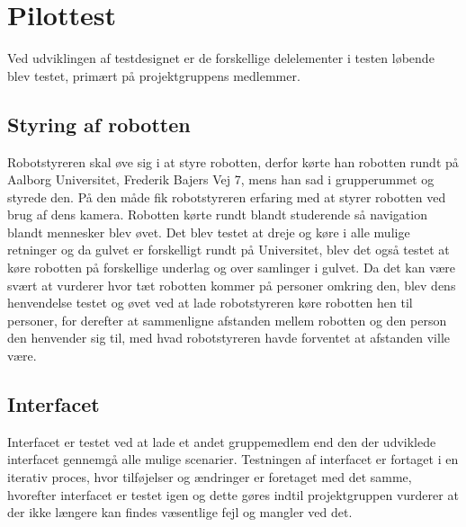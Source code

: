 \section{Pilottest}
\label{ParametrePilottest}
%
Ved udviklingen af testdesignet er de forskellige delelementer i testen løbende blev testet, primært på projektgruppens medlemmer. \blankline
%
\subsection*{Styring af robotten}
Robotstyreren skal øve sig i at styre robotten, derfor kørte han robotten rundt på Aalborg Universitet, Frederik Bajers Vej 7, mens han sad i grupperummet og styrede den. På den måde fik robotstyreren erfaring med at styrer robotten ved brug af dens kamera. Robotten kørte rundt blandt studerende så navigation blandt mennesker blev øvet. Det blev testet at dreje og køre i alle mulige retninger og da gulvet er forskelligt rundt på Universitet, blev det også testet at køre robotten på forskellige underlag og over samlinger i gulvet. 
% 
Da det kan være svært at vurderer hvor tæt robotten kommer på personer omkring den, blev dens henvendelse testet og øvet ved at lade robotstyreren køre robotten hen til personer, for derefter at sammenligne afstanden mellem robotten og den person den henvender sig til, med hvad robotstyreren havde forventet at afstanden ville være. \blankline
%
\subsection*{Interfacet}
Interfacet er testet ved at lade et andet gruppemedlem end den der udviklede interfacet gennemgå alle mulige scenarier. Testningen af interfacet er fortaget i en iterativ proces, hvor tilføjelser og ændringer er foretaget med det samme, hvorefter interfacet er testet igen og dette gøres indtil projektgruppen vurderer at der ikke længere kan findes væsentlige fejl og mangler ved det. \blankline


